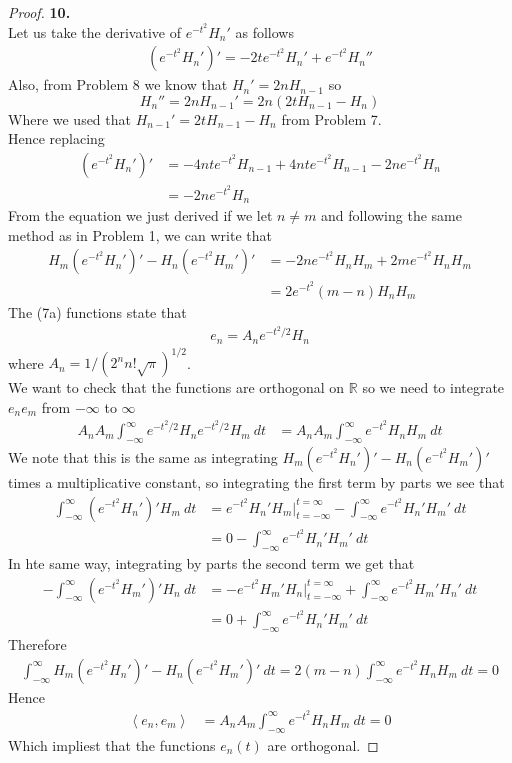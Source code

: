 \documentclass[11pt]{article}
\newcommand{\R}{\mathbb{R}}
\newcommand{\inprd}[1]{\left\langle{#1}\right\rangle}
\theoremstyle{definition}
\begin{document}
\cleardoublepage
\begin{proof}{\textbf{10.}}\\
Let us take the derivative of $e^{-t^2}H_n'$ as follows
\begin{align*}
    (e^{-t^2}H_n')' = -2te^{-t^2}H_n' + e^{-t^2}H_n''
\end{align*}
Also, from Problem 8 we know that $H_n' = 2nH_{n-1}$ so
$$H_n'' = 2nH_{n-1}' = 2n(2tH_{n-1} - H_n)$$
Where we used that $H_{n-1}' = 2tH_{n-1} - H_n$ from Problem 7.\\
Hence replacing
\begin{align*}
    (e^{-t^2}H_n')'
    &= -4nte^{-t^2}H_{n-1} + 4nte^{-t^2}H_{n-1} - 2ne^{-t^2}H_n\\
    &= -2ne^{-t^2}H_n
\end{align*}
From the equation we just derived if we let $n \neq m$ and following the same
method as in Problem 1, we can write that
\begin{align*}
    H_m(e^{-t^2}H_n')' - H_n(e^{-t^2}H_m')'
    &= -2ne^{-t^2}H_nH_m + 2me^{-t^2}H_nH_m\\
    &= 2e^{-t^2}(m - n)H_nH_m
\end{align*}
The (7a) functions state that
\begin{align*}
    e_n = A_n e^{-t^2/2}H_n
\end{align*}
where $A_n = 1/(2^n n! \sqrt{\pi})^{1/2}$.\\
We want to check that the functions are orthogonal on $\R$ so we need
to integrate $e_n e_m$ from $-\infty$ to $\infty$ 
\begin{align*}
    A_nA_m\int_{-\infty}^{\infty}  e^{-t^2/2}H_ne^{-t^2/2}H_m~dt
    &= A_nA_m\int_{-\infty}^{\infty}  e^{-t^2}H_n H_m~dt
\end{align*}
We note that this is the same as integrating
$H_m(e^{-t^2}H_n')' - H_n(e^{-t^2}H_m')'$ times a multiplicative constant, so
integrating the first term by parts we see that
\begin{align*}
    \int_{-\infty}^{\infty}  (e^{-t^2}H_n')'H_m~dt
    &= e^{-t^2}H_n'H_m\bigg|_{t=-\infty}^{t=\infty}
    - \int_{-\infty}^{\infty}  e^{-t^2}H_n'H_m'~dt\\
    &= 0 - \int_{-\infty}^{\infty}  e^{-t^2}H_n'H_m'~dt
\end{align*}
In hte same way, integrating by parts the second term we get that
\begin{align*}
    -\int_{-\infty}^{\infty}  (e^{-t^2}H_m')'H_n~dt
    &= -e^{-t^2}H_m'H_n\bigg|_{t=-\infty}^{t=\infty}
    + \int_{-\infty}^{\infty}  e^{-t^2}H_m'H_n'~dt\\
    &= 0 + \int_{-\infty}^{\infty}  e^{-t^2}H_n'H_m'~dt
\end{align*}
Therefore
\begin{align*}
    \int_{-\infty}^\infty H_m(e^{-t^2}H_n')' - H_n(e^{-t^2}H_m')'~dt = 
    2(m-n)\int_{-\infty}^\infty e^{-t^2}H_nH_m~dt = 0
\end{align*}
Hence
\begin{align*}
    \inprd{e_n, e_m}
    &= A_nA_m\int_{-\infty}^{\infty}  e^{-t^2}H_n H_m~dt
    = 0
\end{align*}
Which impliest that the functions $e_n(t)$ are orthogonal.
\end{proof}
\end{document}

